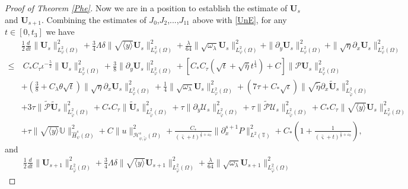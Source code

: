 \documentclass{amsart}
\numberwithin{equation}{section}
\newcommand\y{{{\langle y \rangle}}}
\begin{document}
\begin{proof}[Proof of Theorem \ref{Phe}]
Now we are in a position to establish the estimate of $\mathbf{U}_{s}$ and $\mathbf{U}_{s+1}$. Combining the estimates of $J_{0}$,$J_{2}$,...,$J_{11}$ above with \eqref{UnE}, for any $t\in[0,t_{3}]$ we have
\begin{align*}
&\frac{1}{2}\frac{d}{dt}\|\mathbf{U}_{s}\|_{L_{\varphi}^{2}(\Omega)}^{2}
+\frac{3}{4}\Lambda\delta\|\sqrt{\y}\mathbf{U}_{s}\|_{L_{\varphi}^{2}(\Omega)}^{2}
+\frac{\lambda}{64}\|\sqrt{\omega_{\lambda}}\mathbf{U}_{s}\|_{L_{\varphi}^{2}(\Omega)}^{2}
+\|\partial_{y}\mathbf{U}_{s}\|_{L_{\varphi}^{2}(\Omega)}^{2}
+\|\sqrt{\eta}\partial_{x}\mathbf{U}_{s}\|_{L_{\varphi}^{2}(\Omega)}^{2}\\
\leq&~C_{*}C_{\tau}\iota^{-\frac{5}{2}}\|\mathbf{U}_{s}\|_{L_{\varphi}^{2}(\Omega)}^{2}
     +\frac{3}{8}\|\partial_{y}\mathbf{U}_{s}\|_{L_{\varphi}^{2}(\Omega)}^{2}
     +\left[C_{*}C_{\tau}(\sqrt{t}+\sqrt{\bar{\eta}}t^{\frac{1}{4}})+C\right]\|\mathcal{P}\mathbf{U}_{s}\|_{L_{\varphi}^{2}(\Omega)}^{2}\\
    &+\left(\frac{3}{8}+C_{\lambda}\theta\sqrt{t}\right)\|\sqrt{\eta}\partial_{x}\mathbf{U}_{s}\|_{L_{\varphi}^{2}(\Omega)}^{2}
     +\frac{1}{4}\|\sqrt{\omega_{\lambda}}\mathbf{U}_{s}\|_{L_{\varphi}^{2}(\Omega)}^{2}
     +(7\tau+C_{*}\sqrt{\iota})\|\sqrt{\tilde{\eta}}\partial_{x}\tilde{\mathbf{U}}_{s}\|_{L_{\tilde{\varphi}}^{2}(\Omega)}^{2}\\
    &+3\tau\|\tilde{\mathcal{P}}\tilde{\mathbf{U}}_{s}\|_{L_{\tilde{\varphi}}^{2}(\Omega)}^{2}
     +C_{*}C_{\tau}\|\tilde{\mathbf{U}}_{s}\|_{L_{\tilde{\varphi}}^{2}(\Omega)}^{2}
     +\tau\|\partial_{y}\mathcal{U}_{s}\|_{L_{\tilde{\varphi}}^{2}(\Omega)}^{2}
     +\tau\|\tilde{\mathcal{P}}\mathcal{U}_{s}\|_{L_{\tilde{\varphi}}^{2}(\Omega)}^{2}
     +C_{*}C_{\tau}\|\sqrt{\y}\mathbf{U}_{s}\|_{L_{\varphi}^{2}(\Omega)}^{2}\\
    &+\tau\|\sqrt{\y}\mathbb{U}\|_{\hat{H}_{\psi}^{s}(\Omega)}^{2}
     +C\|u\|_{\mathcal{H}_{\psi,\tilde{\varphi}}^{s}(\Omega)}^{2}
     +\frac{C_{*}}{(\bar{\varsigma}+t)^{\frac{1}{2}+\varepsilon_{0}}}\|\partial_{x}^{s+1}P\|_{L^{2}(\mathbb{T})}^{2}
     +C_{*}\left(1+\frac{1}{(\bar{\varsigma}+t)^{\frac{1}{2}+\varepsilon_{0}}}\right),
\end{align*}
and
\begin{align*}
&\frac{1}{2}\frac{d}{dt}\|\mathbf{U}_{s+1}\|_{L_{\hat{\varphi}}^{2}(\Omega)}^{2}
+\frac{3}{4}\Lambda\delta\|\sqrt{\y}\mathbf{U}_{s+1}\|_{L_{\hat{\varphi}}^{2}(\Omega)}^{2}
+\frac{\lambda}{64}\|\sqrt{\omega_{\lambda}}\mathbf{U}_{s+1}\|_{L_{\hat{\varphi}}^{2}(\Omega)}^{2}

\end{align*}
\end{proof}
\end{document}
